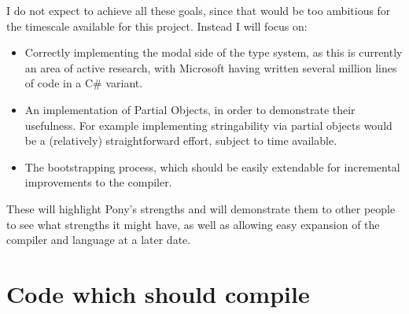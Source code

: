 \documentclass[11pt,a4paper]{report}
\begin{document}
I do not expect to achieve all these goals, since that would be too ambitious for the timescale available for this project.
Instead I will focus on:
\begin{itemize}
\item Correctly implementing the modal side of the type system, as	this is currently an area of active research, with Microsoft having written several million lines of code in a C\# variant\cite{microsoft2012}.
\item An implementation of Partial Objects, in order to demonstrate their usefulness.
	For example implementing stringability via partial objects would be a (relatively) straightforward effort, subject to time available.
\item The bootstrapping process, which should be easily extendable for incremental improvements to the compiler.
\end{itemize}

These will highlight Pony's strengths and will demonstrate them to other people to see what strengths it might have, as well as allowing easy expansion of the compiler and language at a later date.

\section{Code which should compile}
\end{document}
